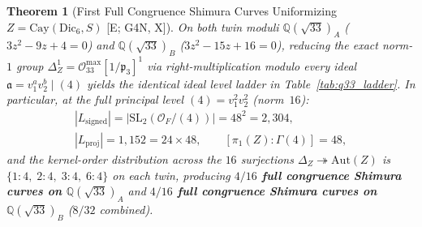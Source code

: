 \documentclass[11pt]{amsart}
\numberwithin{equation}{section}
\theoremstyle{plain}
\newtheorem{theorem}{Theorem}[section]
\theoremstyle{definition}\newtheorem{definition}[theorem]{Definition}
\theoremstyle{remark}\newtheorem{remark}[theorem]{Remark}
\newcommand{\Q}{\mathbb{Q}}
\newcommand{\calO}{\mathcal{O}}
\newcommand{\frp}{\mathfrak{p}}
\newcommand{\SL}{\mathrm{SL}}
\newcommand{\Aut}{\mathrm{Aut}}
\newcommand{\Cay}{\mathrm{Cay}}
\newcommand{\Dic}{\mathrm{Dic}}
\newcommand{\ctag}[1]{\textup{\textsf{\scriptsize[#1]}}}
\begin{document}
\begin{theorem}[First Full Congruence Shimura Curves Uniformizing $Z = \Cay(\Dic_6, S)$ \ctag{E; G4N, X}]\label{thm:q33_congruence}
On \emph{both} twin moduli $\Q(\sqrt{33})_A$ ($3z^2-9z+4=0$) and $\Q(\sqrt{33})_B$ ($3z^2-15z+16=0$), reducing the exact norm-$1$ group $\Delta_Z^1 = \calO_{33}^{\max}[1/\frp_3]^1$ via right-multiplication modulo every ideal $\mathfrak{a} = v_1^a v_2^b \mid (4)$ yields the identical ideal level ladder in Table~\ref{tab:q33_ladder}. In particular, at the full principal level $(4) = v_1^2 v_2^2$ (norm~$16$):
\begin{equation}\label{eq:q33_level4}
\begin{gathered}
|L_{\mathrm{signed}}| = |\SL_2(\calO_F/(4))| = 48^2 = 2{,}304, \\
|L_{\mathrm{proj}}| = 1{,}152 = 24 \times 48, \qquad [\pi_1(Z) : \Gamma(4)] = 48,
\end{gathered}
\end{equation}
and the kernel-order distribution across the $16$ surjections $\Delta_Z \twoheadrightarrow \Aut(Z)$ is $\{1{:}4,\; 2{:}4,\; 3{:}4,\; 6{:}4\}$ on \emph{each} twin, producing \textbf{$4/16$ full congruence Shimura curves on $\Q(\sqrt{33})_A$} and \textbf{$4/16$ full congruence Shimura curves on $\Q(\sqrt{33})_B$} ($8/32$ combined).
\end{theorem}

\begin{table}[htbp]
\centering
\caption{Exact ideal level ladder $\mathfrak{a} = v_1^a v_2^b \mid (4)$ on both twins $\Q(\sqrt{33})_A$ and $\Q(\sqrt{33})_B$ (identical across all $8$ rows; verified independently in Python \texttt{A2} and Rust \texttt{R2}).}
\label{tab:q33_ladder}
\footnotesize
\setlength{\tabcolsep}{4.5pt}
\end{table}
\end{document}
